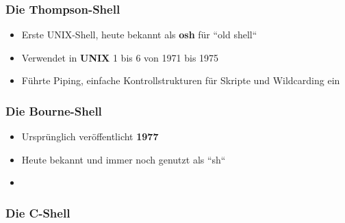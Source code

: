\begin{frame}
    \frametitle{Die Thompson-Shell}
    \begin{itemize}
        \item Erste UNIX-Shell, heute bekannt als \textbf{osh} für ``old shell``
        \item Verwendet in \textbf{UNIX} 1 bis 6 von 1971 bis 1975
        \item Führte Piping, einfache Kontrollstrukturen für Skripte und Wildcarding ein
    \end{itemize}
\end{frame}

\begin{frame}
    \frametitle{Die Bourne-Shell}
    \begin{itemize}
        \item Ursprünglich veröffentlicht \textbf{1977}
        \item Heute bekannt und immer noch genutzt als ``sh``
        \item
    \end{itemize}
\end{frame}

\begin{frame}
    \frametitle{Die C-Shell}
\end{frame}
